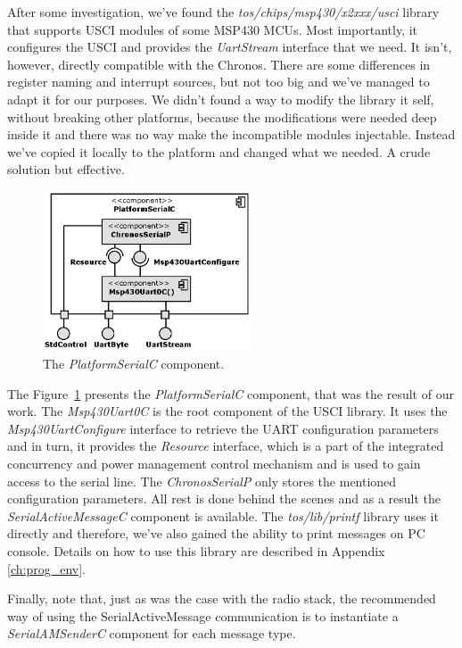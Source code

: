After some investigation, we've found the \emph{tos/chips/msp430/x2xxx/usci} library that supports USCI modules of some MSP430 MCUs. Most importantly, it configures the USCI and provides the \emph{UartStream} interface that we need. It isn't, however, directly compatible with the Chronos. There are some differences in register naming and interrupt sources, but not too big and we've managed to adapt it for our purposes. We didn't found a way to modify the library it self, without breaking other platforms, because the modifications were needed deep inside it and there was no way make the incompatible modules injectable. Instead we've copied it locally to the platform and changed what we needed. A crude solution but effective.

\begin{figure}[h]
  \centering
  \includegraphics[width=0.55\textwidth]{diagrams/platform_serial_c.eps}
  \caption{The \emph{PlatformSerialC} component.}
  \label{fig:platform_serial_c}
\end{figure}

The Figure~\ref{fig:platform_serial_c} presents the \emph{PlatformSerialC} component, that was the result of our work. The \emph{Msp430Uart0C} is the root component of the USCI library. It uses the \emph{Msp430UartConfigure} interface to retrieve the UART configuration parameters and in turn, it provides the \emph{Resource} interface, which is a part of the integrated concurrency and power management control mechanism and is used to gain access to the serial line. The \emph{ChronosSerialP} only stores the mentioned configuration parameters. All rest is done behind the scenes and as a result the \emph{SerialActiveMessageC} component is available. The \emph{tos/lib/printf} library uses it directly and therefore, we've also gained the ability to print messages on PC console. Details on how to use this library are described in Appendix \ref{ch:prog_env}.

Finally, note that, just as was the case with the radio stack, the recommended way of using the SerialActiveMessage communication is to instantiate a \emph{SerialAMSenderC} component for each message type.


